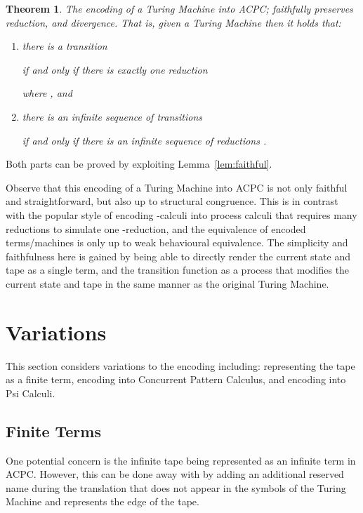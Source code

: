 \documentclass[submission,copyright,creativecommons]{eptcs}
\newtheorem{theorem}{Theorem}[section]
\newenvironment{proof}[1][Proof]{\begin{trivlist}
\item[\hskip \labelsep {\bfseries #1}]}{\end{trivlist}}
\begin{document}
\begin{theorem}
\label{thm:done}
The encoding  of a Turing Machine into ACPC; faithfully preserves reduction, and
divergence.
That is, given a Turing Machine 
then it holds that:
\begin{enumerate}
\item there is a transition

if and only if there is exactly one reduction

where , and
\item there is an infinite sequence of transitions

if and only if there is an infinite sequence of reductions
.
\end{enumerate}
\end{theorem}
\begin{proof}
Both parts can be proved by exploiting Lemma~\ref{lem:faithful}.
\end{proof}

Observe that this encoding of a Turing Machine into ACPC is not only faithful
and straightforward, but also up to structural congruence.
This is in contrast with the popular style of encoding -calculi into process
calculi that requires many reductions to simulate one -reduction, and the
equivalence of encoded terms/machines is only up to weak behavioural equivalence.
The simplicity and faithfulness here is gained by being able to directly render
the current state and tape as a single term, and the transition function as a
process that modifies the current state and tape in the same manner as the original
Turing Machine.

\section{Variations}
\label{sec:var}

This section considers variations to the encoding including:
representing the tape as a finite term,
encoding into Concurrent Pattern Calculus,
and encoding into Psi Calculi.

\subsection*{Finite Terms}

One potential concern is the infinite tape being represented as an infinite term
in ACPC. However, this can be done away with by adding an additional reserved name 
during the translation that does not appear in the symbols of the Turing Machine 
and represents the edge of the tape.
\end{document}
